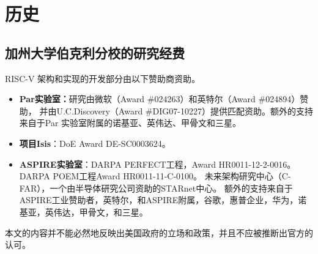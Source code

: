 \chapter{历史
}

\section{ 加州大学伯克利分校的研究经费
}

RISC-V 架构和实现的开发部分由以下赞助商资助。

\begin{itemize}
\item {\bf Par实验室：}研究由微软（Award \#024263）和英特尔（Award \#024894）赞助，
并由U.C.Discovery（Award \#DIG07-10227）提供匹配资助。额外的支持来自于Par 实验室附属的诺基亚、英伟达、甲骨文和三星。

\item {\bf 项目Isis}：DoE Award DE-SC0003624。 

\item {\bf ASPIRE实验室}：DARPA PERFECT工程，Award HR0011-12-2-0016。DARPA POEM工程Award HR0011-11-C-0100。
未来架构研究中心（C-FAR），一个由半导体研究公司资助的STARnet中心。
额外的支持来自于ASPIRE工业赞助者，英特尔，和ASPIRE附属，谷歌，惠普企业，华为，诺基亚，英伟达，甲骨文，和三星。

\end{itemize}

本文的内容并不能必然地反映出美国政府的立场和政策，并且不应被推断出官方的认可。


